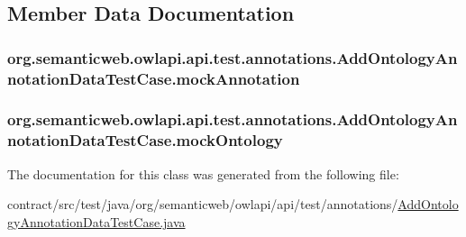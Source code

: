\subsection{Member Data Documentation}
\hypertarget{classorg_1_1semanticweb_1_1owlapi_1_1api_1_1test_1_1annotations_1_1_add_ontology_annotation_data_test_case_a41aa206569bfab065733893c8512c8d6}{
\subsubsection[{mock\-Annotation}]{ org.\-semanticweb.\-owlapi.\-api.\-test.\-annotations.\-Add\-Ontology\-Annotation\-Data\-Test\-Case.\-mock\-Annotation\hspace{0.3cm}{\ttfamily [private]}}}\label{classorg_1_1semanticweb_1_1owlapi_1_1api_1_1test_1_1annotations_1_1_add_ontology_annotation_data_test_case_a41aa206569bfab065733893c8512c8d6}
\hypertarget{classorg_1_1semanticweb_1_1owlapi_1_1api_1_1test_1_1annotations_1_1_add_ontology_annotation_data_test_case_a4d04ca5b7700d630ddc604ce442e4650}{
\subsubsection[{mock\-Ontology}]{ org.\-semanticweb.\-owlapi.\-api.\-test.\-annotations.\-Add\-Ontology\-Annotation\-Data\-Test\-Case.\-mock\-Ontology\hspace{0.3cm}{\ttfamily [private]}}}\label{classorg_1_1semanticweb_1_1owlapi_1_1api_1_1test_1_1annotations_1_1_add_ontology_annotation_data_test_case_a4d04ca5b7700d630ddc604ce442e4650}


The documentation for this class was generated from the following file\-:\begin{DoxyCompactItemize}
\item 
contract/src/test/java/org/semanticweb/owlapi/api/test/annotations/\hyperlink{_add_ontology_annotation_data_test_case_8java}{Add\-Ontology\-Annotation\-Data\-Test\-Case.\-java}\end{DoxyCompactItemize}
